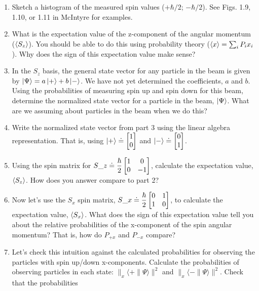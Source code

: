 \documentclass[
]{article}
\providecommand{\tightlist}{%
  \setlength{\itemsep}{0pt}\setlength{\parskip}{0pt}}
\providecommand{\tightlist}{%
  \setlength{\itemsep}{0pt}\setlength{\parskip}{0pt}}
\begin{document}
\begin{enumerate}
\def\labelenumi{\arabic{enumi}.}
\tightlist
\item
  Sketch a histogram of the measured spin values (\(+\hbar/2\);
  \(-\hbar/2\)). See Figs. 1.9, 1.10, or 1.11 in McIntyre for examples.
\item
  What is the expectation value of the z-component of the angular
  momentum (\(\braket{S_z}\)). You should be able to do this using
  probability theory (\(\braket{x} = \sum_i P_i x_i\)). Why does the
  sign of this expectation value make sense?
\item
  In the \(S_z\) basis, the general state vector for any particle in the
  beam is given by \(\ket{\Psi} = a\ket{+} + b\ket{-}\). We have not yet
  determined the coefficients, \(a\) and \(b\). Using the probabilities
  of measuring spin up and spin down for this beam, determine the
  normalized state vector for a particle in the beam, \(\ket{\Psi}\).
  What are we assuming about particles in the beam when we do this?
\item
  Write the normalized state vector from part 3 using the linear algebra
  representation. That is, using \(\ket{+} \doteq \begin{bmatrix} 1 \cr 0 \end{bmatrix}\) and \(\ket{-} \doteq \begin{bmatrix} 0 \cr 1\end{bmatrix}\).
\item
  Using the spin matrix for \(S\_z \doteq \dfrac{\hbar}{2}\begin{bmatrix} 1 & 0 \cr 0 & -1 \end{bmatrix}\), calculate the expectation value, \(\braket{S_z}\). How does you
  answer compare to part 2?
\item
  Now let's use the \(S_x\) spin matrix, \(S\_x \doteq \dfrac{\hbar}{2}\begin{bmatrix} 0 & 1 \cr 1 & 0 \end{bmatrix}\), to calculate the expectation value, \(\braket{S_x}\). What does
  the sign of this expectation value tell you about the relative
  probabilities of the x-component of the spin angular momentum? That
  is, how do \(P_{+x}\) and \(P_{-x}\) compare?
\item
  Let's check this intuition against the calculated probabilities for
  observing the particles with spin up/down x-components. Calculate the
  probabilities of observing particles in each state:
  \(\|_x\langle + \| \Psi \rangle\|^2\) and
  \(\|_x\langle - \| \Psi \rangle\|^2\). Check that the probabilities

\end{enumerate}
\end{document}

